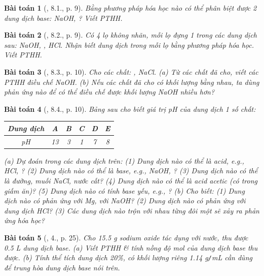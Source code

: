 \documentclass{article}
\newtheorem{baitoan}{Bài toán}
\begin{document}
\begin{baitoan}[\cite{SGK_Hoa_Hoc_9}, 8.1., p. 9]
	Bằng phương pháp hóa học nào có thể phân biệt được 2 dung dịch base: {\rm NaOH, }? Viết PTHH.
\end{baitoan}

\begin{baitoan}[\cite{SGK_Hoa_Hoc_9}, 8.2., p. 9]
	Có 4 lọ không nhãn, mỗi lọ đựng 1 trong các dung dịch sau: {\rm NaOH, , HCl}. Nhận biết dung dịch trong mỗi lọ bằng phương pháp hóa học. Viết {\rm PTHH}.
\end{baitoan}

\begin{baitoan}[\cite{SGK_Hoa_Hoc_9}, 8.3., p. 10]
	Cho các chất: {\rm{}, NaCl}. (a) Từ các chất đã cho, viết các {\rm PTHH} điều chế {\rm NaOH}. (b) Nếu các chất đã cho có khối lượng bằng nhau, ta dùng phản ứng nào để có thể điều chế được khối lượng {\rm NaOH} nhiều hơn?
\end{baitoan}

\begin{baitoan}[\cite{SGK_Hoa_Hoc_9}, 8.4., p. 10]
	Bảng sau cho biết giá trị pH của dung dịch 1 số chất:
	\begin{table}[H]
		\centering
		\begin{tabular}{|c|c|c|c|c|c|}
			\hline
			Dung dịch & A & B & C & D & E \\
			\hline
			pH & 13 & 3 & 1 & 7 & 8 \\
			\hline
		\end{tabular}
	\end{table}
	\noindent(a) Dự đoán trong các dung dịch trên: (1) Dung dịch nào có thể là acid, e.g., {\rm HCl, }? (2) Dung dịch nào có thể là base, e.g., {\rm NaOH, }? (3) Dung dịch nào có thể là đường, muối {\rm NaCl}, nước cất? (4) Dung dịch nào có thể là acid acetic (có trong giấm ăn)? (5) Dung dịch nào có tính base yếu, e.g., {\rm{}}? (b) Cho biết: (1) Dung dịch nào có phản ứng với {\rm Mg}, với {\rm NaOH}? (2) Dung dịch nào có phản ứng với dung dịch {\rm HCl}? (3) Các dung dịch nào trộn với nhau từng đôi một sẽ xảy ra phản ứng hóa học?	
\end{baitoan}

\begin{baitoan}[\cite{SGK_Hoa_Hoc_9}, 4., p. 25]
	Cho {\rm15.5 g} sodium oxide {\rm{}} tác dụng với nước, thu được {\rm0.5 L} dung dịch base. (a) Viết {\rm PTHH} \& tính nồng độ mol của dung dịch base thu được. (b) Tính thể tích dung dịch {\rm{} 20\%}, có khối lượng riêng {\rm1.14 g{\tt/}mL} cần dùng để trung hòa dung dịch base nói trên.
\end{baitoan}
\end{document}
